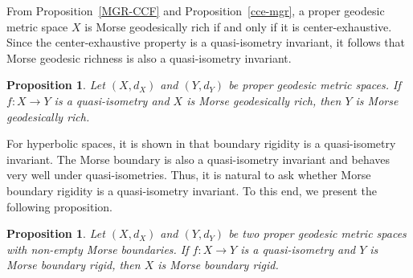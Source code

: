 \documentclass[a4paper,11pt,oneside]{article}
\newtheorem{Proposition}[Theorem]{Proposition}
\begin{document}
From Proposition~\ref{MGR-CCF} and Proposition~\ref{cce-mgr}, a proper geodesic metric space $X$ is Morse geodesically rich if and only if it is center-exhaustive. Since the center-exhaustive property is a quasi-isometry invariant, it follows that Morse geodesic richness is also a quasi-isometry invariant.
\begin{Proposition}
     Let $(X, d_X)$ and $(Y, d_Y)$ be proper geodesic metric spaces. If $f: X \to Y$ is a quasi-isometry and $X$ is Morse geodesically rich, then $Y$ is Morse geodesically rich.
\end{Proposition}

For hyperbolic spaces, it is shown in \cite{LiangZhou24} that boundary rigidity is a quasi-isometry invariant.
The Morse boundary is also a quasi-isometry invariant and behaves very well under quasi-isometries.
Thus, it is natural to ask whether Morse boundary rigidity is a quasi-isometry invariant.
To this end, we present the following proposition.

\begin{Proposition}
    Let $(X, d_X)$ and $(Y, d_Y)$ be two proper geodesic metric spaces with non-empty Morse boundaries. If $f: X\to Y$ is a quasi-isometry and $Y$ is Morse boundary rigid, then $X$ is Morse boundary rigid.
\end{Proposition}
\end{document}
